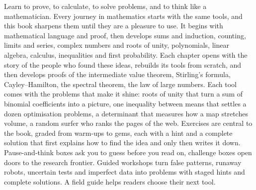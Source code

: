 Learn to prove, to calculate, to solve problems, and to think like a mathematician.
Every journey in mathematics starts with the same tools, and this book sharpens them until they are a pleasure to use.
It begins with mathematical language and proof, then develops sums and induction, counting, limits and series,
complex numbers and roots of unity, polynomials, linear algebra, calculus, inequalities and first probability. Each chapter opens with
the story of the people who found these ideas, rebuilds its tools from scratch, and then develops proofs of the
intermediate value theorem, Stirling's formula, Cayley--Hamilton, the spectral theorem, the law of large numbers.
Each tool comes with the problems that make it shine: roots of unity that turn a sum of binomial coefficients into a picture,
one inequality between means that settles a dozen optimisation problems, a determinant that measures how a map stretches
volume, a random surfer who ranks the pages of the web. Exercises are central to the book, graded from warm-ups to gems,
each with a hint and a complete solution that first explains how to find the idea and only then writes it down.
Pause-and-think boxes ask you to guess before you read on, challenge boxes open doors to the research frontier. Guided workshops turn false patterns, runaway robots, uncertain tests and imperfect data into problems with staged hints and complete solutions. A field guide helps readers choose their next tool.
